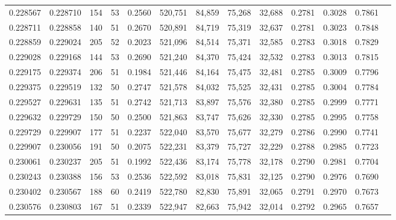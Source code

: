 \begin{tabular}{rrrrrrrrrrrrr}
0.228567 & 0.228710 &   154 &  53 &                                     0.2560 & 520,751 &  84,859 &  75,268 &  32,688 & 0.2781 & 0.3028 & 0.7861 \\
0.228711 & 0.228858 &   140 &  51 &                                     0.2670 & 520,891 &  84,719 &  75,319 &  32,637 & 0.2781 & 0.3023 & 0.7848 \\
0.228859 & 0.229024 &   205 &  52 &                                     0.2023 & 521,096 &  84,514 &  75,371 &  32,585 & 0.2783 & 0.3018 & 0.7829 \\
0.229028 & 0.229168 &   144 &  53 &                                     0.2690 & 521,240 &  84,370 &  75,424 &  32,532 & 0.2783 & 0.3013 & 0.7815 \\
0.229175 & 0.229374 &   206 &  51 &                                     0.1984 & 521,446 &  84,164 &  75,475 &  32,481 & 0.2785 & 0.3009 & 0.7796 \\
0.229375 & 0.229519 &   132 &  50 &                                     0.2747 & 521,578 &  84,032 &  75,525 &  32,431 & 0.2785 & 0.3004 & 0.7784 \\
0.229527 & 0.229631 &   135 &  51 &                                     0.2742 & 521,713 &  83,897 &  75,576 &  32,380 & 0.2785 & 0.2999 & 0.7771 \\
0.229632 & 0.229729 &   150 &  50 &                                     0.2500 & 521,863 &  83,747 &  75,626 &  32,330 & 0.2785 & 0.2995 & 0.7758 \\
0.229729 & 0.229907 &   177 &  51 &                                     0.2237 & 522,040 &  83,570 &  75,677 &  32,279 & 0.2786 & 0.2990 & 0.7741 \\
0.229907 & 0.230056 &   191 &  50 &                                     0.2075 & 522,231 &  83,379 &  75,727 &  32,229 & 0.2788 & 0.2985 & 0.7723 \\
0.230061 & 0.230237 &   205 &  51 &                                     0.1992 & 522,436 &  83,174 &  75,778 &  32,178 & 0.2790 & 0.2981 & 0.7704 \\
0.230243 & 0.230388 &   156 &  53 &                                     0.2536 & 522,592 &  83,018 &  75,831 &  32,125 & 0.2790 & 0.2976 & 0.7690 \\
0.230402 & 0.230567 &   188 &  60 &                                     0.2419 & 522,780 &  82,830 &  75,891 &  32,065 & 0.2791 & 0.2970 & 0.7673 \\
0.230576 & 0.230803 &   167 &  51 &                                     0.2339 & 522,947 &  82,663 &  75,942 &  32,014 & 0.2792 & 0.2965 & 0.7657 \\

\end{tabular}
